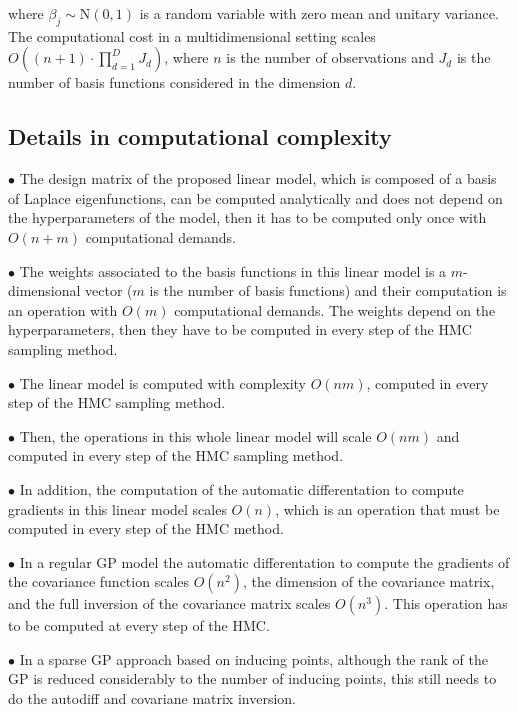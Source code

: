 \documentclass[]{interact}
\theoremstyle{plain}%
\theoremstyle{definition}
\theoremstyle{remark}
\begin{document}
\noindent where $\beta_j \sim \text{N}(0,1)$ is a random variable with zero mean and unitary variance. The computational cost in a multidimensional setting scales $O((n+1)\cdot \prod_{d=1}^D J_d )$, where $n$ is the number of observations and $J_d$ is the number of basis functions considered in the dimension $d$.

\subsection{Details in computational complexity}

\vspace{2mm}
$\bullet$ The design matrix of the proposed linear model, which is composed of a basis of Laplace eigenfunctions, can be computed analytically and does not depend on the hyperparameters of the model, then it has to be computed only once with $O(n+m)$ computational demands.

\vspace{2mm}
$\bullet$ The weights associated to the basis functions in this linear model is a $m$-dimensional vector ($m$ is the number of basis functions) and their computation is an operation with $O(m)$ computational demands. The weights depend on the hyperparameters, then they have to be computed in every step of the HMC sampling method.

\vspace{2mm}
$\bullet$ The linear model is computed with complexity $O(nm)$, computed in every step of the HMC sampling method.

\vspace{2mm}
$\bullet$ Then, the operations in this whole linear model will scale $O(nm)$ and computed in every step of the HMC sampling method.

\vspace{2mm}
$\bullet$ In addition, the computation of the automatic differentation to compute gradients in this linear model scales $O(n)$, which is an operation that must be computed in every step of the HMC method.

\vspace{2mm}
$\bullet$ In a regular GP model the automatic differentation to compute the gradients of the covariance function scales $O(n^2)$, the dimension of the covariance matrix, and the full inversion of the covariance matrix scales $O(n^3)$. This operation has to be computed at every step of the HMC.

\vspace{2mm}
$\bullet$ In a sparse GP approach based on inducing points, although the rank of the GP is reduced considerably to the number of inducing points, this still needs to do the autodiff and covariane matrix inversion.
\end{document}
